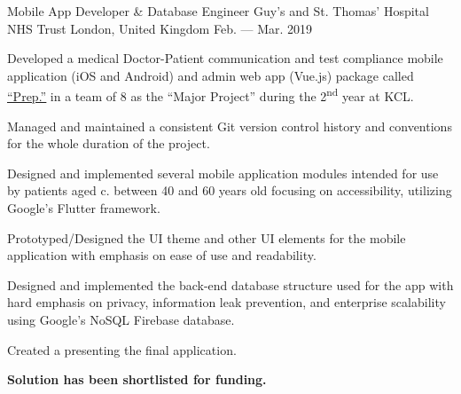 

\begin{cventries}

  \cventry
    {Mobile App Developer \& Database Engineer} %
    {Guy's and St. Thomas’ Hospital NHS Trust} %
    {London, United Kingdom} %
    {Feb. --- Mar. 2019} %
    {
      \begin{cvitems} %
        \item {Developed a medical Doctor-Patient communication and test compliance mobile application (iOS and Android) and admin web app (Vue.js) package called \href{https://davzzar.github.io/prep-page/}{\uline{``Prep.''}} in a team of 8 as the ``Major Project'' during the 2\textsuperscript{nd} year at KCL.}
        \item {Managed and maintained a consistent Git version control history and conventions for the whole duration of the project.}
        \item {Designed and implemented several mobile application modules intended for use by patients aged c. between 40 and 60 years old focusing on accessibility, utilizing Google’s Flutter framework.}
        \item {Prototyped/Designed the UI theme and other UI elements for the mobile application with emphasis on ease of use and readability.}
        \item {Designed and implemented the back-end database structure used for the app with hard emphasis on privacy, information leak prevention, and enterprise scalability using Google’s NoSQL Firebase database.}
        \item {Created a \href{https://drive.google.com/file/d/1Pu6NSpqPXnWcaanUpIu_gd5C1bQnOyQi/preview}{} presenting the final application.}
        \item {\textbf{Solution has been shortlisted for funding.}}
      \end{cvitems}
    }

\end{cventries}
